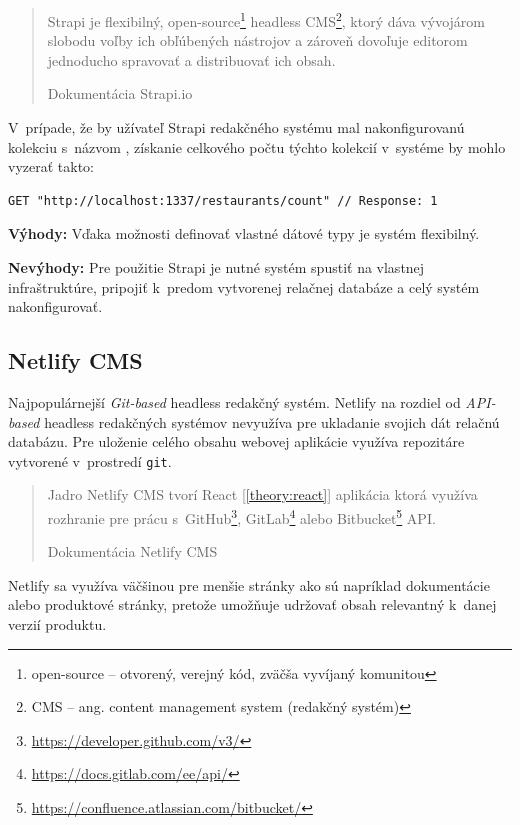 \blockquote[Dokumentácia Strapi.io \cite{StrapiDocs}]{Strapi je flexibilný, open-source\footnote{open-source -- otvorený, verejný kód, zväčša vyvíjaný komunitou} headless CMS\footnote{CMS -- ang. content management system (redakčný systém)}, ktorý dáva vývojárom slobodu voľby ich obľúbených nástrojov a zároveň dovoľuje editorom jednoducho spravovať a distribuovať ich obsah.}

\noindent V~prípade, že by užívateľ Strapi redakčného systému mal nakonfigurovanú kolekciu s~názvom , získanie celkového počtu týchto kolekcií v~systéme by mohlo vyzerať takto: \\

\begin{lstlisting}[caption=Príklad HTTP požiadavku na REST rozhranie Strapi.]
	GET "http://localhost:1337/restaurants/count" // Response: 1
\end{lstlisting}

\medskip

\noindent \textbf{Výhody:} Vďaka možnosti definovať vlastné dátové typy je systém flexibilný.

\medskip

\noindent \textbf{Nevýhody:} Pre použitie Strapi je nutné systém spustiť na vlastnej infraštruktúre, pripojiť k~predom vytvorenej relačnej databáze a celý systém nakonfigurovať.

\subsection{Netlify CMS}
Najpopulárnejší \emph{Git-based} headless redakčný systém. Netlify na rozdiel od \emph{API-based} headless redakčných systémov nevyužíva pre ukladanie svojich dát relačnú databázu. Pre uloženie celého obsahu webovej aplikácie využíva repozitáre vytvorené v~prostredí \texttt{git}.

\blockquote[Dokumentácia Netlify CMS \cite{NetlifyDocs}]{Jadro Netlify CMS tvorí React [\ref{theory:react}] aplikácia ktorá využíva rozhranie pre prácu s~GitHub\footnote{\href{https://developer.github.com/v3/}{https://developer.github.com/v3/}}, GitLab\footnote{\href{https://docs.gitlab.com/ee/api/}{https://docs.gitlab.com/ee/api/}} alebo Bitbucket\footnote{\href{https://confluence.atlassian.com/bitbucket/}{https://confluence.atlassian.com/bitbucket/}} API.}

\noindent Netlify sa využíva väčšinou pre menšie stránky ako sú napríklad dokumentácie alebo produktové stránky, pretože umožňuje udržovať obsah relevantný k~danej verzií produktu. \\

